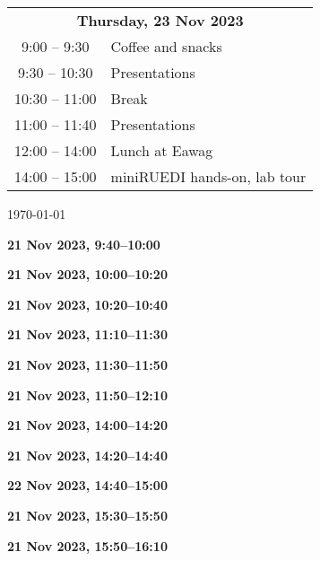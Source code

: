 \documentclass[12pt]{extbook}
\renewcommand{\dateseparator}{--}
\newcommand{\breaktime}[1]{
\bigskip
\begin{center}
\Large\bfseries ***** Break #1 *****
\end{center}
\bigskip}
\renewcommand{\breaktime}[1]{}
\newcommand{\abstract}[2]{{
\bigskip
\begin{center}
\large\bfseries #1
\end{center}}
\par

\clearpage
}
\begin{document}
\begin{center}
\begin{tabular}{c@{\hskip 0.5in}l}
\multicolumn{2}{c}{\bf Thursday, 23 Nov 2023}\\[2ex]
\phantom{1}9:00  -- \phantom{1}9:30	  &	Coffee and snacks\\
\phantom{1}9:30  -- 10:30	&	Presentations\\   %
10:30 -- 11:00	&	Break\\
11:00 -- 11:40	& Presentations\\   %
12:00 -- 14:00	&	Lunch at Eawag\\
14:00 -- 15:00	&	miniRUEDI hands-on, lab tour\\[1.5ex]

\end{tabular}

\enlargethispage{2cm}
\vfill
\renewcommand{\dateseparator}{--}
{\hfill \tiny \today}

\end{center}

\clearpage






\abstract{21 Nov 2023, 9:40--10:00}{abstracts/Daskalopoulou} %
\abstract{21 Nov 2023, 10:00--10:20}{abstracts/Kimani} %
\abstract{21 Nov 2023, 10:20--10:40}{abstracts/Mtili} %

\breaktime{30 min}

\abstract{21 Nov 2023, 11:10--11:30}{abstracts/Giroud} %
\abstract{21 Nov 2023, 11:30--11:50}{abstracts/Roques} %
\abstract{21 Nov 2023, 11:50--12:10}{abstracts/Lightfoot} %

\breaktime{ / Lunch}

\abstract{21 Nov 2023, 14:00--14:20}{abstracts/Dutoit} %
\abstract{21 Nov 2023, 14:20--14:40}{abstracts/Strauch_Zimmer} %
\abstract{22 Nov 2023, 14:40--15:00}{abstracts/Wang} %

\breaktime{30 min}

\abstract{21 Nov 2023, 15:30--15:50}{abstracts/Kipfer} %
\abstract{21 Nov 2023, 15:50--16:10}{abstracts/vanRooyen} %
\end{document}
